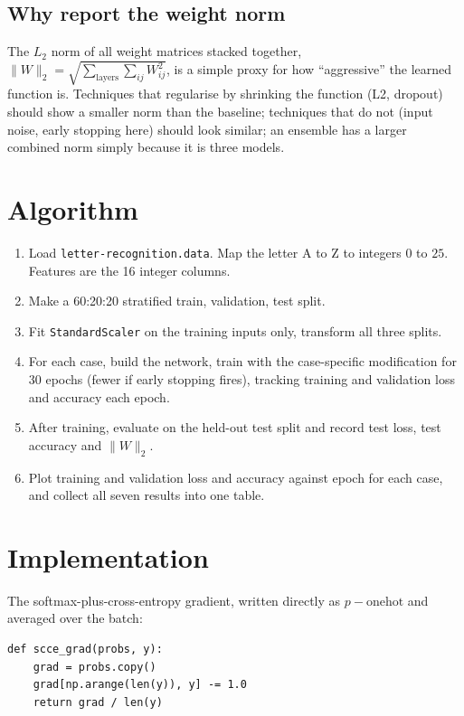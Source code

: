 \documentclass[12pt]{article}
\begin{document}
\subsection{Why report the weight norm}

The $L_2$ norm of all weight matrices stacked together,
$\|W\|_2 = \sqrt{\sum_{\text{layers}} \sum_{ij} W_{ij}^2}$, is a simple proxy
for how ``aggressive'' the learned function is. Techniques that regularise by
shrinking the function (L2, dropout) should show a smaller norm than the
baseline; techniques that do not (input noise, early stopping here) should look
similar; an ensemble has a larger combined norm simply because it is three
models.

\section{Algorithm}

\begin{enumerate}
\item Load \texttt{letter-recognition.data}. Map the letter A to Z to integers
      $0$ to $25$. Features are the 16 integer columns.
\item Make a 60:20:20 stratified train, validation, test split.
\item Fit \texttt{StandardScaler} on the training inputs only, transform all
      three splits.
\item For each case, build the network, train with the case-specific
      modification for 30 epochs (fewer if early stopping fires), tracking
      training and validation loss and accuracy each epoch.
\item After training, evaluate on the held-out test split and record test loss,
      test accuracy and $\|W\|_2$.
\item Plot training and validation loss and accuracy against epoch for each
      case, and collect all seven results into one table.
\end{enumerate}

\section{Implementation}

The softmax-plus-cross-entropy gradient, written directly as $p - \text{onehot}$
and averaged over the batch:

\begin{lstlisting}
def scce_grad(probs, y):
    grad = probs.copy()
    grad[np.arange(len(y)), y] -= 1.0
    return grad / len(y)
\end{lstlisting}
\end{document}
